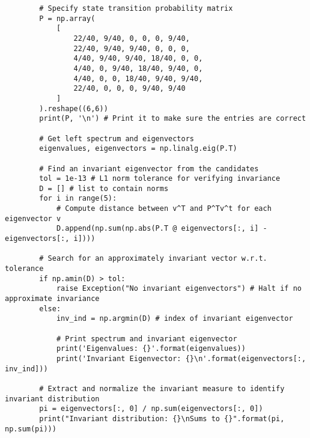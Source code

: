 \documentclass[11pt, letterpaper]{article}
\begin{document}
    \begin{verbatim}
        # Specify state transition probability matrix
        P = np.array(
            [
                22/40, 9/40, 0, 0, 0, 9/40,
                22/40, 9/40, 9/40, 0, 0, 0,
                4/40, 9/40, 9/40, 18/40, 0, 0,
                4/40, 0, 9/40, 18/40, 9/40, 0,
                4/40, 0, 0, 18/40, 9/40, 9/40,
                22/40, 0, 0, 0, 9/40, 9/40
            ]
        ).reshape((6,6))
        print(P, '\n') # Print it to make sure the entries are correct

        # Get left spectrum and eigenvectors
        eigenvalues, eigenvectors = np.linalg.eig(P.T)

        # Find an invariant eigenvector from the candidates
        tol = 1e-13 # L1 norm tolerance for verifying invariance
        D = [] # list to contain norms
        for i in range(5):
            # Compute distance between v^T and P^Tv^t for each eigenvector v
            D.append(np.sum(np.abs(P.T @ eigenvectors[:, i] - eigenvectors[:, i])))

        # Search for an approximately invariant vector w.r.t. tolerance
        if np.amin(D) > tol:
            raise Exception("No invariant eigenvectors") # Halt if no approximate invariance
        else:
            inv_ind = np.argmin(D) # index of invariant eigenvector

            # Print spectrum and invariant eigenvector
            print('Eigenvalues: {}'.format(eigenvalues))
            print('Invariant Eigenvector: {}\n'.format(eigenvectors[:, inv_ind]))

        # Extract and normalize the invariant measure to identify invariant distribution
        pi = eigenvectors[:, 0] / np.sum(eigenvectors[:, 0])
        print("Invariant distribution: {}\nSums to {}".format(pi, np.sum(pi)))
    \end{verbatim}
\end{document}
